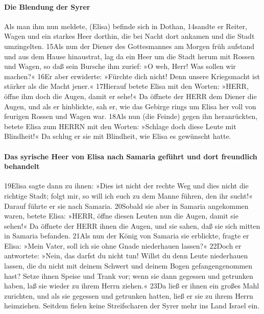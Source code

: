 \hypertarget{die-blendung-der-syrer}{%
\paragraph{Die Blendung der Syrer}\label{die-blendung-der-syrer}}

Als man ihm nun meldete, (Elisa) befinde sich in Dothan, 14sandte er
Reiter, Wagen und ein starkes Heer dorthin, die bei Nacht dort ankamen
und die Stadt umzingelten. 15Als nun der Diener des Gottesmannes am
Morgen früh aufstand und aus dem Hause hinaustrat, lag da ein Heer um
die Stadt herum mit Rossen und Wagen, so daß sein Bursche ihm zurief: »O
weh, Herr! Was sollen wir machen?« 16Er aber erwiderte: »Fürchte dich
nicht! Denn unsere Kriegsmacht ist stärker als die Macht jener.«
17Hierauf betete Elisa mit den Worten: »HERR, öffne ihm doch die Augen,
damit er sehe!« Da öffnete der HERR dem Diener die Augen, und als er
hinblickte, sah er, wie das Gebirge rings um Elisa her voll von feurigen
Rossen und Wagen war. 18Als nun (die Feinde) gegen ihn heranrückten,
betete Elisa zum HERRN mit den Worten: »Schlage doch diese Leute mit
Blindheit!« Da schlug er sie mit Blindheit, wie Elisa es gewünscht
hatte.

\hypertarget{das-syrische-heer-von-elisa-nach-samaria-gefuxfchrt-und-dort-freundlich-behandelt}{%
\paragraph{Das syrische Heer von Elisa nach Samaria geführt und dort
freundlich
behandelt}\label{das-syrische-heer-von-elisa-nach-samaria-gefuxfchrt-und-dort-freundlich-behandelt}}

19Elisa sagte dann zu ihnen: »Dies ist nicht der rechte Weg und dies
nicht die richtige Stadt; folgt mir, so will ich euch zu dem Manne
führen, den ihr sucht!« Darauf führte er sie nach Samaria. 20Sobald sie
aber in Samaria angekommen waren, betete Elisa: »HERR, öffne diesen
Leuten nun die Augen, damit sie sehen!« Da öffnete der HERR ihnen die
Augen, und sie sahen, daß sie sich mitten in Samaria befanden. 21Als nun
der König von Samaria sie erblickte, fragte er Elisa: »Mein Vater, soll
ich sie ohne Gnade niederhauen lassen?« 22Doch er antwortete: »Nein, das
darfst du nicht tun! Willst du denn Leute niederhauen lassen, die du
nicht mit deinem Schwert und deinem Bogen gefangengenommen hast? Setze
ihnen Speise und Trank vor; wenn sie dann gegessen und getrunken haben,
laß sie wieder zu ihrem Herrn ziehen.« 23Da ließ er ihnen ein großes
Mahl zurichten, und als sie gegessen und getrunken hatten, ließ er sie
zu ihrem Herrn heimziehen. Seitdem fielen keine Streifscharen der Syrer
mehr ins Land Israel ein.


